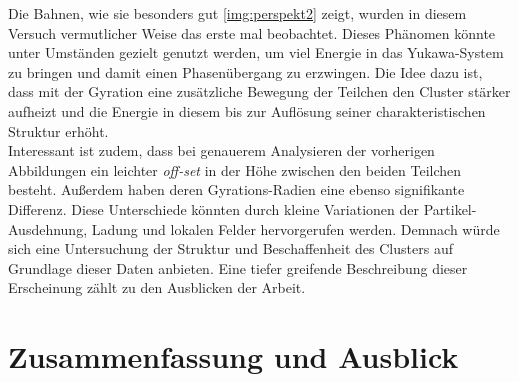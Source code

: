 \documentclass[numbers=noenddot,a4paper,notitlepage,twoside,BCOR15mm]{scrbook}
\newcommand{\tilt}[1]{\textit{#1}}
\begin{document}
						Die Bahnen, wie sie besonders gut \autoref{img:perspekt2} zeigt, wurden in diesem Versuch vermutlicher Weise das erste mal beobachtet. Dieses Phänomen könnte unter Umständen gezielt genutzt werden, um viel Energie in das Yukawa-System zu bringen und damit einen Phasenübergang zu erzwingen. Die Idee dazu ist, dass mit der Gyration eine zusätzliche Bewegung der Teilchen den Cluster stärker aufheizt und die Energie in diesem bis zur Auflösung seiner charakteristischen Struktur erhöht.\\
						Interessant ist zudem, dass bei genauerem Analysieren der vorherigen Abbildungen ein leichter \tilt{off-set} in der Höhe zwischen den beiden Teilchen besteht. Außerdem haben deren Gyrations-Radien eine ebenso signifikante Differenz. Diese Unterschiede könnten durch kleine Variationen der Partikel-Ausdehnung, Ladung und lokalen Felder hervorgerufen werden. Demnach würde sich eine Untersuchung der Struktur und Beschaffenheit des Clusters auf Grundlage dieser Daten anbieten. Eine tiefer greifende Beschreibung dieser Erscheinung zählt zu den Ausblicken der Arbeit.

	\newpage

		\section{Zusammenfassung und Ausblick}
\end{document}
